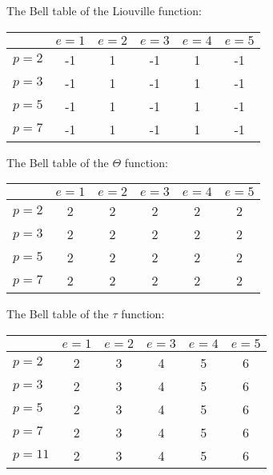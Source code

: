 \documentclass[a4paper]{article}
\begin{document}
\begin{example}
The Bell table of the Liouville function:
\vskip10pt
\begin{center}
\begin{tabular}{| l | | c | c | c | c | c |}
\hline
& $e = 1$ & $e = 2$ & $e = 3$ & $e = 4$ & $e = 5$\\
\hline
\hline
$p = 2$ & -1 & 1 & -1 & 1 & -1 \\
\hline
$p = 3$ & -1 & 1 & -1 & 1 & -1 \\
\hline
$p = 5$ & -1 & 1 & -1 & 1 & -1 \\
\hline
$p = 7$ & -1 & 1 & -1 & 1 & -1 \\
\hline
\end{tabular}
\end{center}
\end{example}

\begin{example}
The Bell table of the $\Theta$ function:
\vskip10pt
\begin{center}
\begin{tabular}{| l | | c | c | c | c | c |}
\hline
& $e = 1$ & $e = 2$ & $e = 3$ & $e = 4$ & $e = 5$\\
\hline
\hline
$p = 2$ & 2 & 2 & 2 & 2 & 2 \\
\hline
$p = 3$ & 2 & 2 & 2 & 2 & 2 \\
\hline
$p = 5$ & 2 & 2 & 2 & 2 & 2 \\
\hline
$p = 7$ & 2 & 2 & 2 & 2 & 2 \\
\hline
\end{tabular}
\end{center}
\end{example}

\begin{example}
The Bell table of the $\tau$ function:
\vskip10pt
\begin{center}
\begin{tabular}{| l | | c | c | c | c | c |}
\hline
& $e = 1$ & $e = 2$ & $e = 3$ & $e = 4$ & $e = 5$\\
\hline
\hline
$p = 2$ & 2 & 3 & 4 & 5 & 6 \\
\hline
$p = 3$ & 2 & 3 & 4 & 5 & 6 \\
\hline
$p = 5$ & 2 & 3 & 4 & 5 & 6 \\
\hline
$p = 7$ & 2 & 3 & 4 & 5 & 6 \\
\hline
$p = 11$ & 2 & 3 & 4 & 5 & 6 \\
\hline
\end{tabular}
\end{center}
\end{example}
\end{document}
